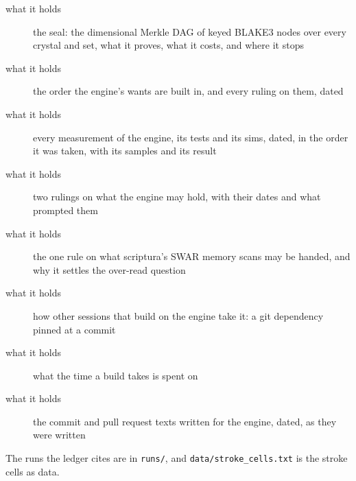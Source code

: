 \begin{description}
\item[{what it holds}] the seal: the dimensional Merkle DAG of keyed BLAKE3 nodes over every crystal and set, what it proves, what it costs, and where it stops
\end{description}

\begin{description}
\item[{what it holds}] the order the engine's wants are built in, and every ruling on them, dated
\end{description}

\begin{description}
\item[{what it holds}] every measurement of the engine, its tests and its sims, dated, in the order it was taken, with its samples and its result
\end{description}

\begin{description}
\item[{what it holds}] two rulings on what the engine may hold, with their dates and what prompted them
\end{description}

\begin{description}
\item[{what it holds}] the one rule on what scriptura's SWAR memory scans may be handed, and why it settles the over-read question
\end{description}

\begin{description}
\item[{what it holds}] how other sessions that build on the engine take it: a git dependency pinned at a commit
\end{description}

\begin{description}
\item[{what it holds}] what the time a build takes is spent on
\end{description}

\begin{description}
\item[{what it holds}] the commit and pull request texts written for the engine, dated, as they were written
\end{description}

The runs the ledger cites are in \texttt{runs/\allowbreak{}}, and \texttt{data/\allowbreak{}stroke\_\allowbreak{}cells.\allowbreak{}txt} is the stroke cells as data.
